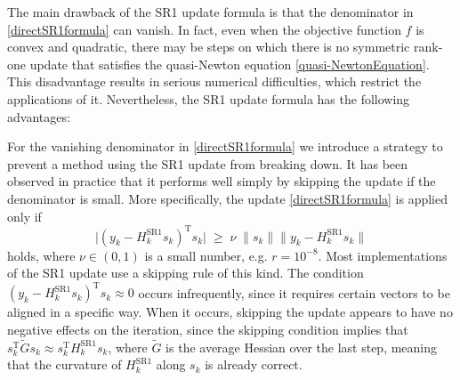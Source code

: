 The main drawback of the SR1 update formula is that the denominator in \cref{directSR1formula} can vanish. In fact, even when the objective function $f$ is convex and quadratic, there may be steps on which there is no symmetric rank-one update that satisfies the quasi-Newton equation \cref{quasi-NewtonEquation}. This disadvantage results in serious numerical difficulties, which restrict the applications of it. Nevertheless, the SR1 update formula has the following advantages:


For the vanishing denominator in \cref{directSR1formula} we introduce a strategy to prevent a method using the SR1 update from breaking down. It has been observed in practice that it performs well simply by skipping the update if the denominator is small. More specifically, the update \cref{directSR1formula} is applied only if 
\begin{equation}\label{safeguard}
    \lvert (y_k - H^\mathrm{SR1}_k s_k)^{\mathrm{T}} s_k \lvert \; \geq \; \nu \; \lVert s_k \rVert \lVert y_k - H^\mathrm{SR1}_k s_k \rVert 
\end{equation}
holds, where $\nu \in (0, 1)$ is a small number, e.g. $r = 10^{−8}$. Most implementations of the SR1 update use a skipping rule of this kind. The condition $(y_k - H^\mathrm{SR1}_k s_k)^{\mathrm{T}} s_k \approx 0$ occurs infrequently, since it requires certain vectors to be aligned in a specific way. When it occurs, skipping the update appears to have no negative effects on the iteration, since the skipping condition implies that $s^{\mathrm{T}}_k \tilde{G} s_k \approx s^{\mathrm{T}}_k H^\mathrm{SR1}_k s_k$, where $\tilde{G}$ is the average Hessian over the last step, meaning that the curvature of $H^\mathrm{SR1}_k$ along $s_k$ is already correct. \\







